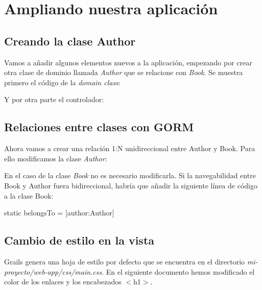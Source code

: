 \documentclass[a4paper,12pt,spanish]{article}
\begin{document}


\section{Ampliando nuestra aplicación}
\subsection{Creando la clase Author}

Vamos a añadir algunos elementos nuevos a la aplicación, empezando por crear otra clase de dominio llamada {\it Author} que se relacione con {\it Book}. Se muestra primero el código de la {\it domain class}:



Y por otra parte el controlador:



\subsection{Relaciones entre clases con GORM}

Ahora vamos a crear una relación 1:N unidireccional entre Author y Book. Para ello modificamos la clase {\it Author}:



En el caso de la clase {\it Book} no es necesario modificarla. Si la navegabilidad entre Book y Author fuera bidireccional, habría que añadir la siguiente línea de código a la clase Book:

\begin{listing}[style=Groovy]
static belongsTo = [author:Author]
\end{listing}

%



\subsection{Cambio de estilo en la vista}

Grails genera una hoja de estilo por defecto que se encuentra en el directorio {\it mi-proyecto/web-app/css/main.css}. En el siguiente documento hemos modificado el color de los enlaces y los encabezados $<$h1$>$.


 
\end{document}
